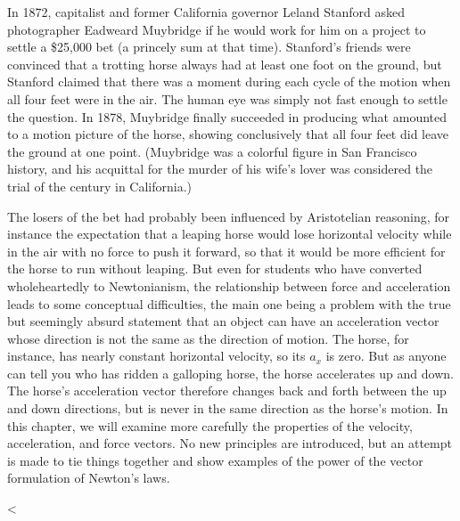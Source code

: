 In 1872, capitalist and former California governor Leland
Stanford asked photographer Eadweard
Muybridge if he would work for
him on a project to settle a \$25,000 bet (a princely sum at
that time). Stanford's friends were convinced that a
trotting horse always had at least one foot on the ground,
but Stanford claimed that there was a moment during each
cycle of the motion when all four feet were in the air. The
human eye was simply not fast enough to settle the question.
In 1878, Muybridge finally succeeded in producing what
amounted to a motion picture of the horse, showing
conclusively that all four feet did leave the ground at one
point. (Muybridge was a colorful figure in San Francisco
history, and his acquittal for the murder of his wife's
lover was considered the trial of the century in California.)

The losers of the bet had probably been influenced by
Aristotelian reasoning, for instance the expectation that a
leaping horse would lose horizontal velocity while in the
air with no force to push it forward, so that it would be
more efficient for the horse to run without leaping. But
even for students who have converted wholeheartedly to
Newtonianism, the relationship between force and acceleration
leads to some conceptual difficulties, the main one being a
problem with the true but seemingly absurd statement that an
object can have an acceleration vector whose direction is
not the same as the direction of motion. The horse, for
instance, has nearly constant horizontal velocity, so its
$a_x$ is zero. But as anyone can tell you who has ridden a
galloping horse, the horse accelerates up and down. The
horse's acceleration vector therefore changes back and forth
between the up and down directions, but is never in the same
direction as the horse's motion. In this chapter, we will
examine more carefully the properties of the velocity,
acceleration, and force vectors. No new principles are
introduced, but an attempt is made to tie things together
and show examples of the power of the vector formulation of Newton's laws.

<%

